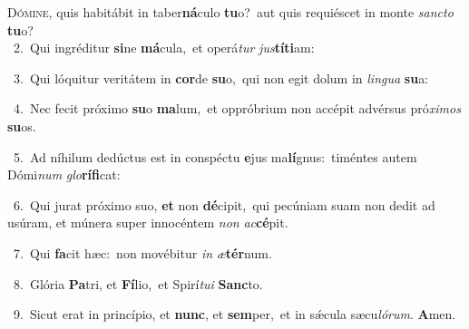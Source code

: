\lettrine{\initial\textcolor{\initialcolor}{D}}{ómine,} quis habitábit in taber\-\textbf{ná}\-culo \textbf{tu}\-o?~\star aut quis requiéscet in monte \textit{sanc}\-\textit{to} \textbf{tu}\-o?\\
{\numbfont\textcolor{\numbcolor}{~2.}}~Qui ingréditur \textbf{si}\-ne \textbf{má}\-cula,~\star et operá\textit{tur} \textit{jus}\-\textbf{tí}\textbf{ti}am:\par
{\numbfont\textcolor{\numbcolor}{~3.}}~Qui lóquitur veritátem in \textbf{cor}\-de \textbf{su}\-o,~\star qui non egit dolum in \textit{lin}\-\textit{gua} \textbf{su}\-a:\par
{\numbfont\textcolor{\numbcolor}{~4.}}~Nec fecit próximo \textbf{su}\-o \textbf{ma}\-lum,~\star et oppróbrium non accépit advérsus pró\-\textit{xi}\-\textit{mos} \textbf{su}\-os.\par
{\numbfont\textcolor{\numbcolor}{~5.}}~Ad níhilum dedúctus est in conspéctu \textbf{e}\-jus ma\-\textbf{lí}\-gnus:~\star timéntes autem Dómi\textit{num} \textit{glo}\-\textbf{rí}\textbf{fi}cat:\par
{\numbfont\textcolor{\numbcolor}{~6.}}~Qui jurat próximo suo, \textbf{et} non \textbf{dé}\-cipit,~\star qui pecúniam suam non dedit ad usúram, et múnera super innocéntem \textit{non} \textit{ac}\-\textbf{cé}pit.\par
{\numbfont\textcolor{\numbcolor}{~7.}}~Qui \textbf{fa}\-cit hæc:~\star non movébitur \textit{in} \textit{æ}\-\textbf{tér}num.\par
{\numbfont\textcolor{\numbcolor}{~8.}}~Glória \textbf{Pa}\-tri, et \textbf{Fí}\-lio,~\star et Spirí\-\textit{tu}\-\textit{i} \textbf{Sanc}\-to.\par
{\numbfont\textcolor{\numbcolor}{~9.}}~Sicut erat in princípio, et \textbf{nunc}\-, et \textbf{sem}\-per,~\star et in sǽcula sæcu\-\textit{ló}\-\textit{rum}. \textbf{A}\-men.\par
